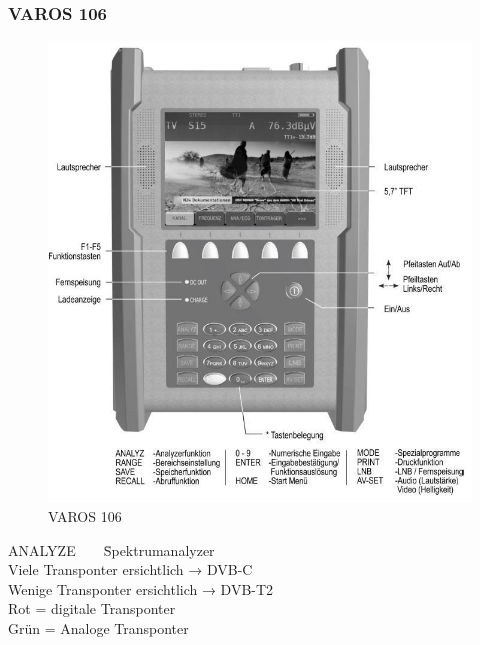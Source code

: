 \documentclass[12pt,a4paper]{article}
\begin{document}
\pagebreak
\subsubsection{VAROS 106}

\begin{figure}[h]
 \centering
 \includegraphics[width=1\textwidth]{"bild2.jpg"}
 \caption{VAROS 106}
 \label{fig:varos106}
\end{figure}

\begin{tabbing}
ANALYZE~~~~\= Spektrumanalyzer\\
\> Viele Transponter ersichtlich → DVB-C\\
\> Wenige Transponter ersichtlich → DVB-T2\\
\> Rot = digitale Transponter\\
\> Grün = Analoge Transponter
\end{tabbing}
\pagebreak
\end{document}
